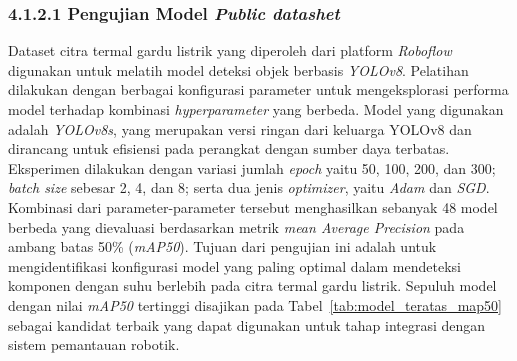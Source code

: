 \subsubsection{4.1.2.1 Pengujian Model \emph{Public datashet}}
Dataset citra termal gardu listrik yang diperoleh dari platform \emph{Roboflow} digunakan untuk melatih model deteksi objek berbasis \emph{YOLOv8}. Pelatihan dilakukan dengan berbagai konfigurasi parameter untuk mengeksplorasi performa model terhadap kombinasi \emph{hyperparameter} yang berbeda. Model yang digunakan adalah \emph{YOLOv8s}, yang merupakan versi ringan dari keluarga YOLOv8 dan dirancang untuk efisiensi pada perangkat dengan sumber daya terbatas. Eksperimen dilakukan dengan variasi jumlah \emph{epoch} yaitu 50, 100, 200, dan 300; \emph{batch size} sebesar 2, 4, dan 8; serta dua jenis \emph{optimizer}, yaitu \emph{Adam} dan \emph{SGD}. Kombinasi dari parameter-parameter tersebut menghasilkan sebanyak 48 model berbeda yang dievaluasi berdasarkan metrik \emph{mean Average Precision} pada ambang batas 50\% (\emph{mAP50}). Tujuan dari pengujian ini adalah untuk mengidentifikasi konfigurasi model yang paling optimal dalam mendeteksi komponen dengan suhu berlebih pada citra termal gardu listrik. Sepuluh model dengan nilai \emph{mAP50} tertinggi disajikan pada Tabel~\ref{tab:model_teratas_map50} sebagai kandidat terbaik yang dapat digunakan untuk tahap integrasi dengan sistem pemantauan robotik.

